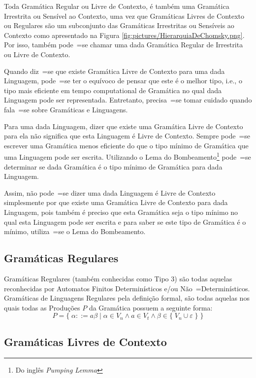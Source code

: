 {    Toda Gramática Regular ou
    Livre de Contexto,
    é também uma Gramática Irrestrita ou
    Sensível ao Contexto,
    uma vez que Gramáticas Livres de Contexto ou
    Regulares são um subconjunto das Gramáticas Irrestritas ou
    Sensíveis ao Contexto como apresentado na Figura \ref{fig:pictures/HierarquiaDeChomsky.png}.
    Por isso,
    também pode~=se chamar uma dada Gramática Regular de Irrestrita ou
    Livre de Contexto.

    Quando diz~=se que existe Gramática Livre de Contexto para uma dada Linguagem,
    pode~=se ter o equívoco de pensar que este é o melhor tipo,
    i.e.,
    o tipo mais eficiente em tempo computational de Gramática no qual dada Linguagem pode ser representada.
    Entretanto,
    precisa~=se tomar cuidado quando fala~=se sobre Gramáticas e
    Linguagens.

    Para uma dada Linguagem,
    dizer que existe uma Gramática Livre de Contexto para ela não significa que esta Linguagem é Livre de Contexto.
    Sempre pode~=se escrever uma Gramática menos eficiente do que o tipo mínimo de Gramática que uma Linguagem pode ser escrita.
    Utilizando o Lema do Bombeamento\footnote{
    Do inglês \textit{Pumping Lemma}
    }
    \cite{hopcroftBook,sipserBook} pode~=se determinar se dada Gramática é o tipo mínimo de Gramática para dada Linguagem.

    Assim,
    não pode~=se dizer uma dada Linguagem é Livre de Contexto simplesmente por que existe uma Gramática Livre de Contexto para dada Linguagem,
    pois também é preciso que esta Gramática seja o tipo mínimo no qual esta Linguagem pode ser escrita e
    para saber se este tipo de Gramática é o mínimo,
    utiliza~=se o Lema do Bombeamento.


\subsection{Gramáticas Regulares}

    Gramáticas Regulares (também conhecidas como Tipo 3) são todas aquelas reconhecidas por Automatos Finitos Determinísticos e\slash{}ou Não~=Determinísticos.
    Gramáticas de Linguagens Regulares pela definição formal,
    são todas aquelas nos quais todas as Produções $P$ da Gramática possuem a seguinte forma:
    $$ P = \{\; \alpha ::= a \beta \;|\; \alpha \in V_n \land a \in V_t
                \land \beta \in \{\; V_n \cup \varepsilon\; \} \;\} $$

\subsection{Gramáticas Livres de Contexto}

}
